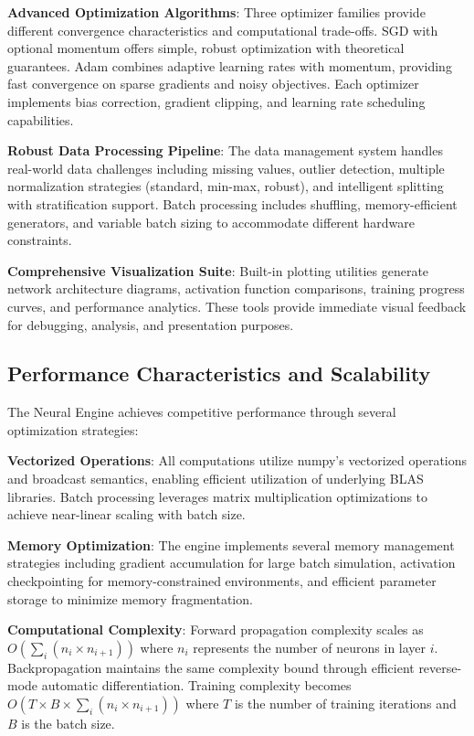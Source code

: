 \documentclass[11pt,a4paper]{report}
\begin{document}
\textbf{Advanced Optimization Algorithms}: Three optimizer families provide different convergence characteristics and computational trade-offs. SGD with optional momentum offers simple, robust optimization with theoretical guarantees. Adam combines adaptive learning rates with momentum, providing fast convergence on sparse gradients and noisy objectives. Each optimizer implements bias correction, gradient clipping, and learning rate scheduling capabilities.

\textbf{Robust Data Processing Pipeline}: The data management system handles real-world data challenges including missing values, outlier detection, multiple normalization strategies (standard, min-max, robust), and intelligent splitting with stratification support. Batch processing includes shuffling, memory-efficient generators, and variable batch sizing to accommodate different hardware constraints.

\textbf{Comprehensive Visualization Suite}: Built-in plotting utilities generate network architecture diagrams, activation function comparisons, training progress curves, and performance analytics. These tools provide immediate visual feedback for debugging, analysis, and presentation purposes.

\subsection{Performance Characteristics and Scalability}

The Neural Engine achieves competitive performance through several optimization strategies:

\textbf{Vectorized Operations}: All computations utilize numpy's vectorized operations and broadcast semantics, enabling efficient utilization of underlying BLAS libraries. Batch processing leverages matrix multiplication optimizations to achieve near-linear scaling with batch size.

\textbf{Memory Optimization}: The engine implements several memory management strategies including gradient accumulation for large batch simulation, activation checkpointing for memory-constrained environments, and efficient parameter storage to minimize memory fragmentation.

\textbf{Computational Complexity}: Forward propagation complexity scales as $O(\sum_{i}(n_i \times n_{i+1}))$ where $n_i$ represents the number of neurons in layer $i$. Backpropagation maintains the same complexity bound through efficient reverse-mode automatic differentiation. Training complexity becomes $O(T \times B \times \sum_{i}(n_i \times n_{i+1}))$ where $T$ is the number of training iterations and $B$ is the batch size.
\end{document}
